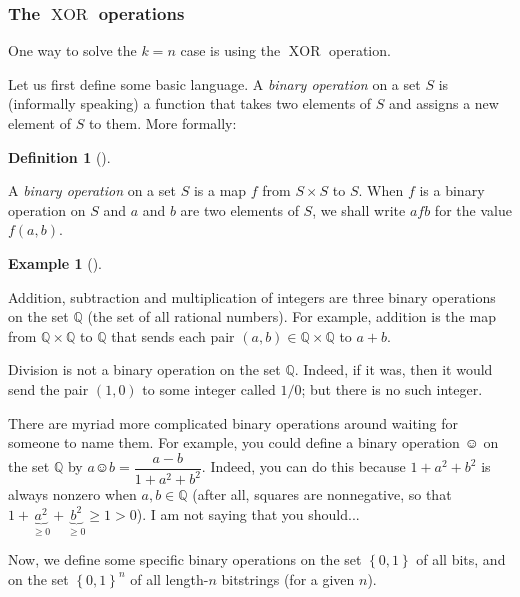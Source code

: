 \documentclass[numbers=enddot,12pt,final,onecolumn,notitlepage]{scrartcl}%
\numberwithin{exer}{subsection}
\theoremstyle{definition}
\newtheorem{defi}[theo]{Definition}
\newenvironment{definition}[1][]
{\begin{defi}[#1]\begin{leftbar}}
{\end{leftbar}\end{defi}}
\newtheorem{exam}[theo]{Example}
\newenvironment{example}[1][]
{\begin{exam}[#1]\begin{leftbar}}
{\end{leftbar}\end{exam}}
\begin{document}
\subsubsection{The $\operatorname*{XOR}$ operations}

One way to solve the $k=n$ case is using the $\operatorname*{XOR}$ operation.

Let us first define some basic language. A \textit{binary operation} on a set
$S$ is (informally speaking) a function that takes two elements of $S$ and
assigns a new element of $S$ to them. More formally:

\begin{definition}
A \textit{binary operation} on a set $S$ is a map $f$ from $S\times S$ to $S$.
When $f$ is a binary operation on $S$ and $a$ and $b$ are two elements of $S$,
we shall write $afb$ for the value $f\left(  a,b\right)  $.
\end{definition}

\begin{example}
Addition, subtraction and multiplication of integers are three binary
operations on the set $\mathbb{Q}$ (the set of all rational numbers). For
example, addition is the map from $\mathbb{Q}\times\mathbb{Q}$ to $\mathbb{Q}$
that sends each pair $\left(  a,b\right)  \in\mathbb{Q}\times\mathbb{Q}$ to
$a+b$.

Division is not a binary operation on the set $\mathbb{Q}$. Indeed, if it was,
then it would send the pair $\left(  1,0\right)  $ to some integer called
$1/0$; but there is no such integer.

There are myriad more complicated binary operations around waiting for someone
to name them. For example, you could define a binary operation $\smiley{}$ on
the set $\mathbb{Q}$ by $a\smiley{}b=\dfrac{a-b}{1+a^{2}+b^{2}}$. Indeed, you
can do this because $1+a^{2}+b^{2}$ is always nonzero when $a,b\in\mathbb{Q}$
(after all, squares are nonnegative, so that $1+\underbrace{a^{2}}_{\geq
0}+\underbrace{b^{2}}_{\geq0}\geq1>0$). I am not saying that you should...
\end{example}

Now, we define some specific binary operations on the set $\left\{
0,1\right\}  $ of all bits, and on the set $\left\{  0,1\right\}  ^{n}$ of all
length-$n$ bitstrings (for a given $n$).
\end{document}
